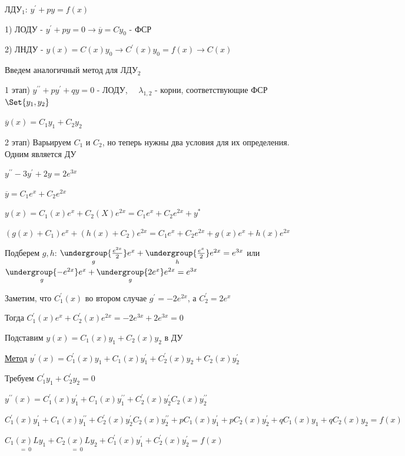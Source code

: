 \documentclass[12pt]{article}
\begin{document}
    \Mem ЛДУ$_1$: $y^\prime + py = f(x)$

    1) ЛОДУ - $y^\prime + py = 0 \to \overline{y} = Cy_0$ - ФСР

    2) ЛНДУ - $y(x) = C(x)y_0 \longrightarrow C^\prime(x) y_0 = f(x) \to C(x)$

    \Nota Введем аналогичный метод для ЛДУ$_2$

    1 этап) $y^{\prime\prime} + py^\prime + qy = 0$ - ЛОДУ, $\quad \lambda_{1, 2}$ - корни, соответствующие ФСР $\Set{y_1, y_2}$

    $\overline{y}(x) = C_1 y_1 + C_2 y_2$

    2 этап) Варьируем $C_1$ и $C_2$, но теперь нужны два условия для их определения. Одним является ДУ

    \Ex $y^{\prime\prime} - 3y^\prime + 2y = 2e^{3x}$

    $\overline{y} = C_1 e^x + C_2 e^{2x}$

    $y(x) = C_1(x)e^x + C_2(X)e^{2x} = C_1 e^x + C_2 e^{2x} + y^*$

    $(g(x) + C_1)e^x + (h(x) + C_2)e^{2x} = C_1 e^x + C_2 e^{2x} + g(x)e^x + h(x)e^{2x}$

    Подберем $g, h$: $\underset{g}{\undergroup{\frac{e^{2x}}{2}}}e^x + \underset{h}{\undergroup{\frac{e^x}{2}}}e^{2x} = e^{3x}$ или
    $\underset{g}{\undergroup{-e^{2x}}} e^x + \underset{g}{\undergroup{2e^x}} e^{2x} = e^{3x}$

    Заметим, что $C_1^\prime(x)$ во втором случае $g^\prime = -2e^{2x}$, а $C_2^\prime = 2e^x$

    Тогда $C_1^\prime(x) e^x + C^\prime_2 (x) e^{2x} = -2e^{3x} + 2e^{3x} = 0$

    \Nota Подставим $y(x) = C_1 (x) y_1 + C_2 (x) y_2$ в ДУ

    \underline{Метод} $y^\prime(x) = C^\prime_1(x) y_1 + C_1(x)y^\prime_1 + C^\prime_2(x) y_2 + C_2(x)y^\prime_2$

    Требуем $C^\prime_1 y_1 + C_2^\prime y_2 = 0$

    $y^{\prime\prime}(x) = C_1^\prime (x) y_1^\prime + C_1 (x) y_1^{\prime\prime} + C_2^\prime (x) y_2^\prime C_2 (x) y_2^{\prime\prime}$

    $C_1^\prime (x) y_1^\prime + C_1 (x) y_1^{\prime\prime} + C_2^\prime (x) y_2^\prime C_2 (x) y_2^{\prime\prime} + pC_1(x)y^\prime_1 + pC_2(x)y^\prime_2 + qC_1(x)y_1 + qC_2(x)y_2 = f(x)$

    $\underset{=\ 0}{C_1(x)Ly_1} + \underset{=\ 0}{C_2(x)Ly_2} + C_1^\prime(x)y_1^\prime + C_2^\prime(x)y_2^\prime = f(x)$
\end{document}
